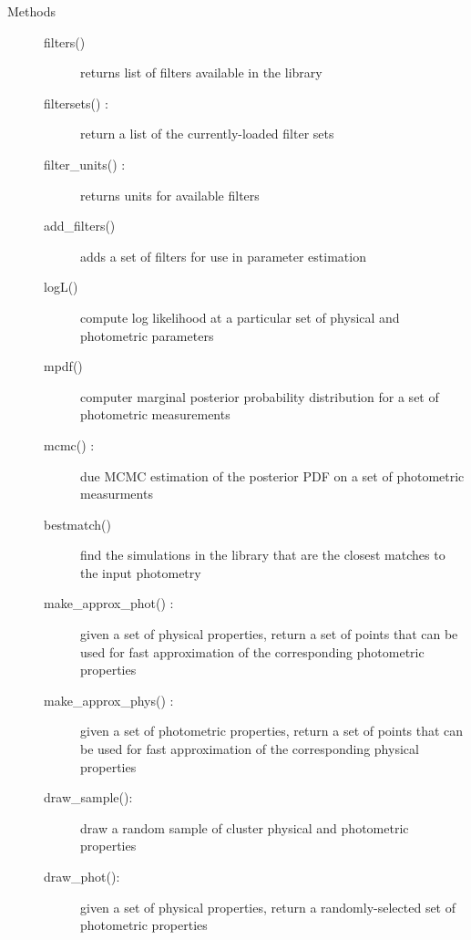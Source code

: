 \documentclass[letterpaper,10pt,english]{sphinxmanual}
\begin{document}
\begin{fulllineitems}
\begin{description}
\item[{Methods}] \leavevmode\begin{description}
\item[{filters()}] \leavevmode{[}{]}
returns list of filters available in the library

\item[{filtersets() :}] \leavevmode
return a list of the currently-loaded filter sets

\item[{filter\_units() :}] \leavevmode
returns units for available filters

\item[{add\_filters()}] \leavevmode{[}{]}
adds a set of filters for use in parameter estimation

\item[{logL()}] \leavevmode{[}{]}
compute log likelihood at a particular set of physical and
photometric parameters

\item[{mpdf()}] \leavevmode{[}{]}
computer marginal posterior probability distribution for a
set of photometric measurements

\item[{mcmc() :}] \leavevmode
due MCMC estimation of the posterior PDF on a set of
photometric measurments

\item[{bestmatch()}] \leavevmode{[}{]}
find the simulations in the library that are the closest
matches to the input photometry

\item[{make\_approx\_phot() :}] \leavevmode
given a set of physical properties, return a set of points
that can be used for fast approximation of the corresponding
photometric properties

\item[{make\_approx\_phys() :}] \leavevmode
given a set of photometric properties, return a set of points
that can be used for fast approximation of the corresponding
physical properties

\item[{draw\_sample():}] \leavevmode
draw a random sample of cluster physical and photometric
properties

\item[{draw\_phot():}] \leavevmode
given a set of physical properties, return a
randomly-selected set of photometric properties

\end{description}


\end{description}
\end{fulllineitems}
\end{document}
